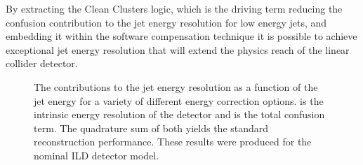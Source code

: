 By extracting the Clean Clusters logic, which is the driving term reducing the confusion contribution to the jet energy resolution for low energy jets, and embedding it within the software compensation technique it is possible to achieve exceptional jet energy resolution that will extend the physics reach of the linear collider detector.  

\begin{figure}
\caption[The contributions to the jet energy resolution as a function of the jet energy for a variety of different energy correction options.  \protect{} is the intrinsic energy resolution of the detector and \protect{} is the total confusion term.  The quadrature sum of both yields the standard reconstruction performance.  These results were produced for the nominal ILD detector model.]{The contributions to the jet energy resolution as a function of the jet energy for a variety of different energy correction options.  \protect{} is the intrinsic energy resolution of the detector and \protect{} is the total confusion term.  The quadrature sum of both yields the standard reconstruction performance.  These results were produced for the nominal ILD detector model.}
\label{fig:jerbreakdownsoftcomp}
\end{figure}
